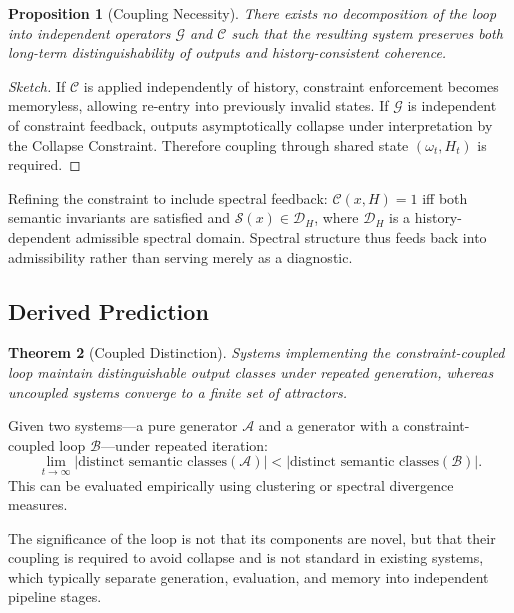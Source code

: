 \documentclass[12pt, a4paper]{article}
\theoremstyle{plain}
\newtheorem{theorem}{Theorem}[section]
\newtheorem{proposition}[theorem]{Proposition}
\theoremstyle{definition}
\theoremstyle{remark}
\begin{document}
\begin{proposition}[Coupling Necessity]
There exists no decomposition of the loop into independent operators $\mathcal{G}$ and $\mathcal{C}$ such that the resulting system preserves both long-term distinguishability of outputs and history-consistent coherence.
\end{proposition}

\begin{proof}[Sketch]
If $\mathcal{C}$ is applied independently of history, constraint enforcement becomes memoryless, allowing re-entry into previously invalid states. If $\mathcal{G}$ is independent of constraint feedback, outputs asymptotically collapse under interpretation by the Collapse Constraint. Therefore coupling through shared state $(\omega_t, H_t)$ is required.
\end{proof}

Refining the constraint to include spectral feedback: $\mathcal{C}(x, H) = 1$ iff both semantic invariants are satisfied and $\mathcal{S}(x) \in \mathcal{D}_H$, where $\mathcal{D}_H$ is a history-dependent admissible spectral domain. Spectral structure thus feeds back into admissibility rather than serving merely as a diagnostic.

\subsection{Derived Prediction}

\begin{theorem}[Coupled Distinction]
Systems implementing the constraint-coupled loop maintain distinguishable output classes under repeated generation, whereas uncoupled systems converge to a finite set of attractors.
\end{theorem}

Given two systems---a pure generator $\mathcal{A}$ and a generator with a constraint-coupled loop $\mathcal{B}$---under repeated iteration:
\[
\lim_{t \to \infty} |\text{distinct semantic classes}(\mathcal{A})| < |\text{distinct semantic classes}(\mathcal{B})|.
\]
This can be evaluated empirically using clustering or spectral divergence measures.

The significance of the loop is not that its components are novel, but that their coupling is required to avoid collapse and is not standard in existing systems, which typically separate generation, evaluation, and memory into independent pipeline stages.

\end{document}
